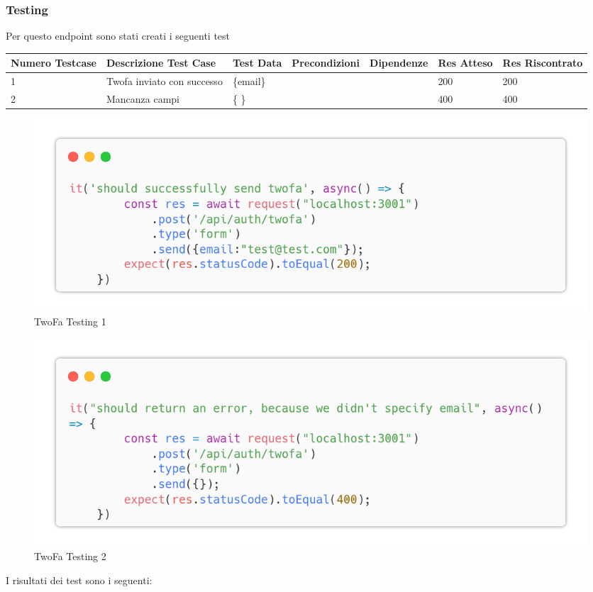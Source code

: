 \documentclass{report}
\begin{document}
\subsubsection*{Testing}
Per questo endpoint sono stati creati i seguenti test
\begin{center} %
	\centering
	\begin{tabular}{ |p{1cm}|p{2cm}|p{2cm}|p{2cm}|p{2cm}|p{1cm}|p{1cm}| }
		\hline
		Numero Testcase & Descrizione Test Case      & Test Data & Precondizioni & Dipendenze & Res Atteso & Res Riscontrato \\
		\hline
		1               & Twofa inviato con successo & \{email\} &               &            & 200        & 200             \\
		\hline
		2               & Mancanza campi             & \{ \}     &               &            & 400        & 400             \\
		\hline
	\end{tabular}
\end{center}
\begin{figure}[H]
	\centering\includegraphics[width=1\textwidth]{images/microservizio-autenticazione/tests/twofa_test_1.png}
	\caption{TwoFa Testing 1}
\end{figure}
\begin{figure}[H]
	\centering\includegraphics[width=1\textwidth]{images/microservizio-autenticazione/tests/twofa_test_2.png}
	\caption{TwoFa Testing 2}
\end{figure}
I risultati dei test sono i seguenti:
\end{document}

